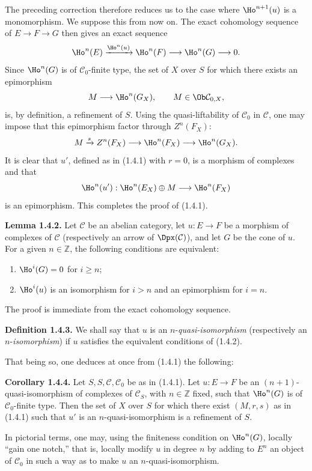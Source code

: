 \documentclass[11pt]{article}
\begin{document}
The preceding correction therefore reduces us to the case where \(\Ho^{n+1}(u)\) is a monomorphism. We suppose this from now on. The exact cohomology sequence of \(E\to F\to G\) then gives an exact sequence
\[
  \Ho^n(E)\xrightarrow{\Ho^n(u)}
  \Ho^n(F)\longrightarrow \Ho^n(G)\longrightarrow 0.
\]
Since \(\Ho^n(G)\) is of \(\mathcal C_0\)-finite type, the set of \(X\) over \(S\) for which there exists an epimorphism
\[
  M\longrightarrow \Ho^n(G_X),\qquad M\in\Ob\mathcal C_{0,X},
\]
is, by definition, a refinement of \(S\). Using the quasi-liftability of \(\mathcal C_0\) in \(\mathcal C\), one may impose that this epimorphism factor through \(Z^n(F_X)\):
\[
  M\xrightarrow{s}Z^n(F_X)\longrightarrow \Ho^n(F_X)\longrightarrow \Ho^n(G_X).
\]
It is clear that \(u'\), defined as in (1.4.1) with \(r=0\), is a morphism of complexes and that
\[
  \Ho^n(u'):\Ho^n(E_X)\oplus M\longrightarrow \Ho^n(F_X)
\]
is an epimorphism. This completes the proof of (1.4.1).

\textbf{Lemma 1.4.2.} Let \(\mathcal C\) be an abelian category, let \(u:E\to F\) be a morphism of complexes of \(\mathcal C\) (respectively an arrow of \(\Dpx(\mathcal C)\)), and let \(G\) be the cone of \(u\). For a given \(n\in\mathbb Z\), the following conditions are equivalent:
\begin{enumerate}[label=(\roman*)]
\item \(\Ho^i(G)=0\) for \(i\geq n\);
\item \(\Ho^i(u)\) is an isomorphism for \(i>n\) and an epimorphism for \(i=n\).
\end{enumerate}
The proof is immediate from the exact cohomology sequence.

\textbf{Definition 1.4.3.} We shall say that \(u\) is an \(n\)-\emph{quasi-isomorphism} (respectively an \(n\)-\emph{isomorphism}) if \(u\) satisfies the equivalent conditions of (1.4.2).

That being so, one deduces at once from (1.4.1) the following:

\textbf{Corollary 1.4.4.} Let \(S,S,\mathcal C,\mathcal C_0\) be as in (1.4.1). Let \(u:E\to F\) be an \((n+1)\)-quasi-isomorphism of complexes of \(\mathcal C_S\), with \(n\in\mathbb Z\) fixed, such that \(\Ho^n(G)\) is of \(\mathcal C_0\)-finite type. Then the set of \(X\) over \(S\) for which there exist \((M,r,s)\) as in (1.4.1) such that \(u'\) is an \(n\)-quasi-isomorphism is a refinement of \(S\).

In pictorial terms, one may, using the finiteness condition on \(\Ho^n(G)\), locally ``gain one notch,'' that is, locally modify \(u\) in degree \(n\) by adding to \(E^n\) an object of \(\mathcal C_0\) in such a way as to make \(u\) an \(n\)-quasi-isomorphism.
\end{document}
